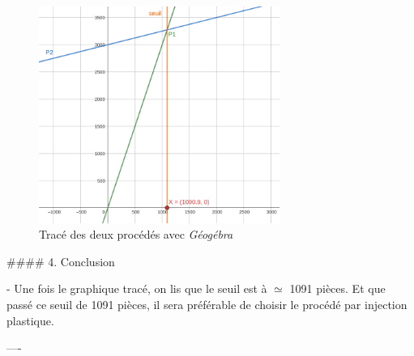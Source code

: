 \documentclass{beamer}
\begin{document}
\begin{frame}[fragile]
\begin{figure}
\includegraphics[width=0.7\textwidth]{G2.png}
\caption{Tracé des deux procédés avec \textit{Géogébra}}
\end{figure}

\bigskip




\bigskip

\begin{markdown}

#### 4. Conclusion

- Une fois le graphique tracé, on lis que le seuil est à $\simeq$ 1091 pièces. Et que passé ce seuil de 1091 pièces, il sera préférable de choisir le procédé par injection plastique.

----

\end{markdown}

\end{frame}
\end{document}

